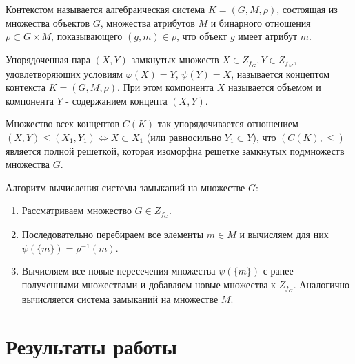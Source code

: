 \documentclass[spec, och, labwork]{shiza}
\begin{document}
Контекстом называется алгебраическая система $K = (G, M, \rho)$, состоящая из множества объектов $G$, множества атрибутов $M$ и бинарного отношения $\rho \subset G \times M$, показывающего $(g, m) \in \rho$, что объект $g$ имеет атрибут $m$.

Упорядоченная пара $(X, Y)$ замкнутых множеств $X \in Z_{f_G}, Y \in Z_{f_M}$, удовлетворяющих условиям $\varphi(X) = Y$, $\psi(Y) = X$, называется концептом контекста $K = (G, M, \rho)$. При этом компонента $X$ называется объемом и компонента $Y$ - содержанием концепта $(X, Y)$.

Множество всех концептов $C(K)$ так упорядочивается отношением \\ $(X, Y) \leq (X_1, Y_1) \Leftrightarrow X \subset X_1$ (или равносильно $Y_1 \subset Y$), что $(C(K), \leq)$ является полной решеткой, которая изоморфна решетке замкнутых подмножеств множества $G$.

Алгоритм вычисления системы замыканий на множестве $G$:
\begin{enumerate}
    \item Рассматриваем множество $G \in Z_{f_G}$.
    \item Последовательно перебираем все элементы $m \in M$ и вычисляем для них $\psi(\{m\}) = \rho^{-1}(m)$.
    \item Вычисляем все новые пересечения множества $\psi(\{m\})$ с ранее полученными множествами и добавляем новые множества к $Z_{f_G}$. Аналогично вычисляется система замыканий на множестве $M$.
\end{enumerate}

\section{Результаты работы}
\end{document}
